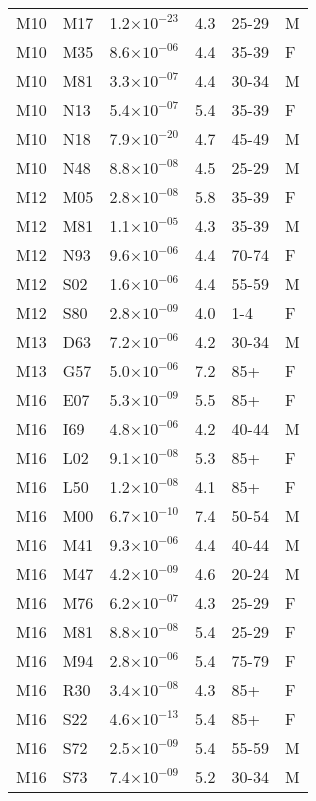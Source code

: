 \begin{longtable}{lllrll}
   M10 & M17 & 1.2$\times10^{-23}$ & 4.3 & 25-29 & M \\ 
   M10 & M35 & 8.6$\times10^{-06}$ & 4.4 & 35-39 & F \\ 
   M10 & M81 & 3.3$\times10^{-07}$ & 4.4 & 30-34 & M \\ 
   M10 & N13 & 5.4$\times10^{-07}$ & 5.4 & 35-39 & F \\ 
   M10 & N18 & 7.9$\times10^{-20}$ & 4.7 & 45-49 & M \\ 
   M10 & N48 & 8.8$\times10^{-08}$ & 4.5 & 25-29 & M \\ 
   M12 & M05 & 2.8$\times10^{-08}$ & 5.8 & 35-39 & F \\ 
   M12 & M81 & 1.1$\times10^{-05}$ & 4.3 & 35-39 & M \\ 
   M12 & N93 & 9.6$\times10^{-06}$ & 4.4 & 70-74 & F \\ 
   M12 & S02 & 1.6$\times10^{-06}$ & 4.4 & 55-59 & M \\ 
   M12 & S80 & 2.8$\times10^{-09}$ & 4.0 & 1-4 & F \\ 
   M13 & D63 & 7.2$\times10^{-06}$ & 4.2 & 30-34 & M \\ 
   M13 & G57 & 5.0$\times10^{-06}$ & 7.2 & 85+ & F \\ 
   M16 & E07 & 5.3$\times10^{-09}$ & 5.5 & 85+ & F \\ 
   M16 & I69 & 4.8$\times10^{-06}$ & 4.2 & 40-44 & M \\ 
   M16 & L02 & 9.1$\times10^{-08}$ & 5.3 & 85+ & F \\ 
   M16 & L50 & 1.2$\times10^{-08}$ & 4.1 & 85+ & F \\ 
   M16 & M00 & 6.7$\times10^{-10}$ & 7.4 & 50-54 & M \\ 
   M16 & M41 & 9.3$\times10^{-06}$ & 4.4 & 40-44 & M \\ 
   M16 & M47 & 4.2$\times10^{-09}$ & 4.6 & 20-24 & M \\ 
   M16 & M76 & 6.2$\times10^{-07}$ & 4.3 & 25-29 & F \\ 
   M16 & M81 & 8.8$\times10^{-08}$ & 5.4 & 25-29 & F \\ 
   M16 & M94 & 2.8$\times10^{-06}$ & 5.4 & 75-79 & F \\ 
   M16 & R30 & 3.4$\times10^{-08}$ & 4.3 & 85+ & F \\ 
   M16 & S22 & 4.6$\times10^{-13}$ & 5.4 & 85+ & F \\ 
   M16 & S72 & 2.5$\times10^{-09}$ & 5.4 & 55-59 & M \\ 
   M16 & S73 & 7.4$\times10^{-09}$ & 5.2 & 30-34 & M \\ 

\end{longtable}
